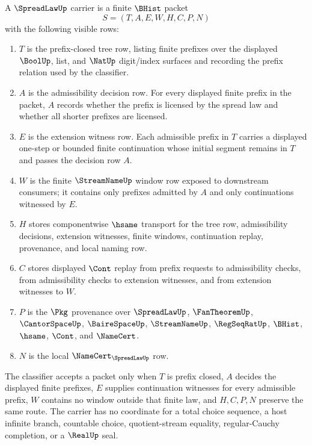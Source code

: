 \begin{definition}
\label{def:spread-law-carrier}
A $\SpreadLawUp$ carrier is a finite $\BHist$ packet
$$
S=(T,A,E,W,H,C,P,N)
$$
with the following visible rows:
\begin{enumerate}
\item $T$ is the prefix-closed tree row, listing finite prefixes over the displayed $\BoolUp$, list, and $\NatUp$ digit/index surfaces and recording the prefix relation used by the classifier.
\item $A$ is the admissibility decision row. For every displayed finite prefix in the packet, $A$ records whether the prefix is licensed by the spread law and whether all shorter prefixes are licensed.
\item $E$ is the extension witness row. Each admissible prefix in $T$ carries a displayed one-step or bounded finite continuation whose initial segment remains in $T$ and passes the decision row $A$.
\item $W$ is the finite $\StreamNameUp$ window row exposed to downstream consumers; it contains only prefixes admitted by $A$ and only continuations witnessed by $E$.
\item $H$ stores componentwise $\hsame$ transport for the tree row, admissibility decisions, extension witnesses, finite windows, continuation replay, provenance, and local naming row.
\item $C$ stores displayed $\Cont$ replay from prefix requests to admissibility checks, from admissibility checks to extension witnesses, and from extension witnesses to $W$.
\item $P$ is the $\Pkg$ provenance over $\SpreadLawUp$, $\FanTheoremUp$, $\CantorSpaceUp$, $\BaireSpaceUp$, $\StreamNameUp$, $\RegSeqRatUp$, $\BHist$, $\hsame$, $\Cont$, and $\NameCert$.
\item $N$ is the local $\NameCert_{\SpreadLawUp}$ row.
\end{enumerate}
The classifier accepts a packet only when $T$ is prefix closed, $A$ decides the displayed finite prefixes, $E$ supplies continuation witnesses for every admissible prefix, $W$ contains no window outside that finite law, and $H,C,P,N$ preserve the same route. The carrier has no coordinate for a total choice sequence, a host infinite branch, countable choice, quotient-stream equality, regular-Cauchy completion, or a $\RealUp$ seal.
\end{definition}

